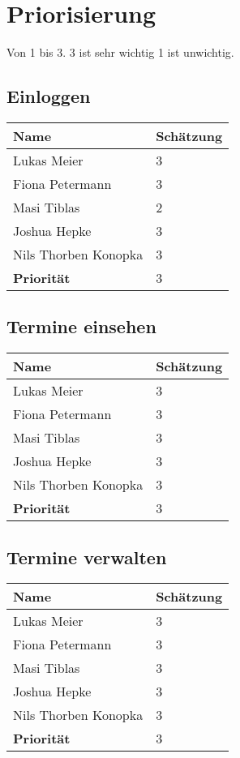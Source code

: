 
\clearpage

\section{Priorisierung}
Von 1 bis 3. 3 ist sehr wichtig 1 ist unwichtig.

\vspace{18pt}

\subsection{Einloggen}
\begin{tabular} {|p{5cm}|p{}|}
	\hline
	Name & Schätzung \\
	\hline
	Lukas Meier 
	& 3 \\
	\hline
	Fiona Petermann 
	& 3 \\
	\hline
	Masi Tiblas 
	& 2 \\
	\hline
	Joshua Hepke
	& 3 \\
	\hline
	Nils Thorben Konopka
	& 3 \\
	\hline \hline
	\textbf{Priorität}
	& 3 \\
	\hline
\end{tabular}

\newpage

\subsection{Termine einsehen}
\begin{tabular} {|p{5cm}|p{}|}
	\hline
	Name & Schätzung \\
	\hline
	Lukas Meier 
	& 3 \\
	\hline
	Fiona Petermann 
	& 3 \\
	\hline
	Masi Tiblas 
	& 3 \\
	\hline
	Joshua Hepke
	& 3 \\
	\hline
	Nils Thorben Konopka
	& 3 \\
	\hline \hline
	\textbf{Priorität}
	& 3 \\
	\hline
\end{tabular}

\newpage

\subsection{Termine verwalten}
\begin{tabular} {|p{5cm}|p{}|}
	\hline
	Name & Schätzung \\
	\hline
	Lukas Meier 
	& 3 \\
	\hline
	Fiona Petermann 
	& 3 \\
	\hline
	Masi Tiblas 
	& 3 \\
	\hline
	Joshua Hepke
	& 3 \\
	\hline
	Nils Thorben Konopka
	& 3 \\
	\hline \hline
	\textbf{Priorität}
	& 3 \\
	\hline
\end{tabular}

